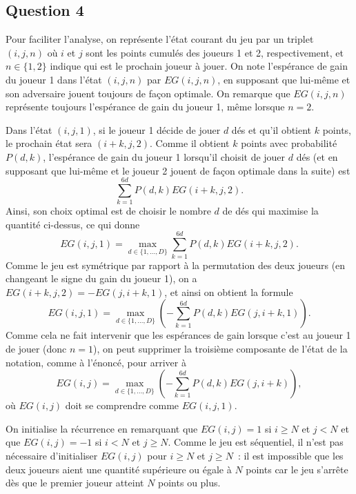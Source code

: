 \documentclass[a4paper,11pt]{amsart}
\theoremstyle{plain}
\begin{document}
\subsection{Question 4}

Pour faciliter l'analyse, on représente l'état courant du jeu par un triplet $(i, j, n)$ où $i$ et $j$ sont les points cumulés des joueurs 1 et 2, respectivement, et $n \in \{1, 2\}$ indique qui est le prochain joueur à jouer. On note l'espérance de gain du joueur 1 dans l'état $(i, j, n)$ par $EG(i, j, n)$, en supposant que lui-même et son adversaire jouent toujours de façon optimale. On remarque que $EG(i, j, n)$ représente toujours l'espérance de gain du joueur 1, même lorsque $n = 2$.

Dans l'état $(i, j, 1)$, si le joueur 1 décide de jouer $d$ dés et qu'il obtient $k$ points, le prochain état sera $(i+k, j, 2)$. Comme il obtient $k$ points avec probabilité $P(d, k)$, l'espérance de gain du joueur 1 lorsqu'il choisit de jouer $d$ dés (et en supposant que lui-même et le joueur 2 jouent de façon optimale dans la suite) est
\begin{equation}
\label{EsperanceGainDFixe}
\sum_{k=1}^{6d} P(d, k) EG(i+k, j, 2).
\end{equation}
Ainsi, son choix optimal est de choisir le nombre $d$ de dés qui maximise la quantité ci-dessus, ce qui donne
\[
EG(i, j, 1) = \max_{d \in \{1, \dotsc, D\}} \sum_{k=1}^{6d} P(d, k) EG(i+k, j, 2).
\]
Comme le jeu est symétrique par rapport à la permutation des deux joueurs (en changeant le signe du gain du joueur 1), on a $EG(i+k, j, 2) = -EG(j, i+k, 1)$, et ainsi on obtient la formule
\[
EG(i, j, 1) = \max_{d \in \{1, \dotsc, D\}} \left(-\sum_{k=1}^{6d} P(d, k) EG(j, i+k, 1)\right).
\]
Comme cela ne fait intervenir que les espérances de gain lorsque c'est au joueur 1 de jouer (donc $n = 1$), on peut supprimer la troisième composante de l'état de la notation, comme à l'énoncé, pour arriver à
\begin{equation}
\label{EsperanceGainRec}
EG(i, j) = \max_{d \in \{1, \dotsc, D\}} \left(-\sum_{k=1}^{6d} P(d, k) EG(j, i+k)\right),
\end{equation}
où $EG(i, j)$ doit se comprendre comme $EG(i, j, 1)$.

On initialise la récurrence en remarquant que $EG(i, j) = 1$ si $i \geq N$ et $j < N$ et que $EG(i, j) = -1$ si $i < N$ et $j \geq N$. Comme le jeu est séquentiel, il n'est pas nécessaire d'initialiser $EG(i, j)$ pour $i \geq N$ et $j \geq N$~: il est impossible que les deux joueurs aient une quantité supérieure ou égale à $N$ points car le jeu s'arrête dès que le premier joueur atteint $N$ points ou plus.
\end{document}
